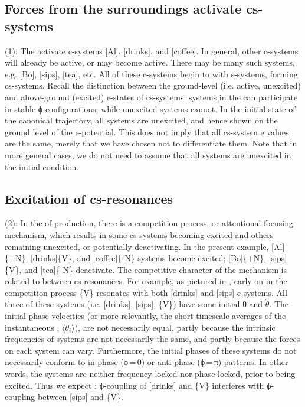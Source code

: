 \subsection{Forces from the surroundings activate cs-systems} 

(1): The  activate c-systems [Al], [drinks], and [coffee]. In general, other c-systems will already be active, or may become active. There may be many such systems, e.g. [Bo], [sips], [tea], etc. All of these c-systems begin to  with s-systems, forming cs-systems. Recall the distinction between the ground-level (i.e. active, unexcited) and above-ground (excited) e-states of cs-systems: systems in the  can participate in stable ϕ-configurations, while unexcited systems cannot. In the initial state of the canonical trajectory, all systems are unexcited, and hence shown on the ground level of the e-potential. This does not imply that all cs-system e values are the same, merely that we have chosen not to differentiate them. Note that in more general cases, we do not need to assume that all systems are unexcited in the initial condition.

\subsection{Excitation of cs-resonances}

(2): In the  of production, there is a competition process, or attentional focusing mechanism, which results in some cs-systems becoming excited and others remaining unexcited, or potentially deactivating. In the present example, [Al]\{+N\}, [drinks]\{V\}, and [coffee]\{-N\} systems become excited; [Bo]\linebreak\relax\{+N\}, [sips]\{V\}, and [tea]\{-N\} deactivate. The competitive character of the mechanism is related to  between cs-resonances. For example, as pictured in {}, early on in the competition process \{V\} resonates with both [drinks] and [sips] c-systems. All three of these systems (i.e. [drinks], [sips], \{V\}) have some initial θ and $\dot{\theta} $. The initial phase velocities (or more relevantly, the short-timescale averages of the instantaneous , $\langle\dot{\theta_i}\rangle$), are not necessarily equal, partly because the intrinsic frequencies of systems are not necessarily the same, and partly because the  forces on each system can vary. Furthermore, the initial phases of these systems do not necessarily conform to in-phase (ϕ\,=\,0) or anti-phase (ϕ\,=\,π) patterns. In other words, the systems are neither frequency-locked nor phase-locked, prior to being excited. Thus we expect : ϕ{}-coupling of [drinks] and \{V\} interferes with ϕ{}-coupling between [sips] and \{V\}.

